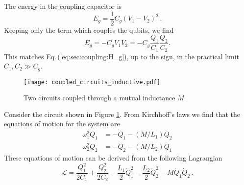 
The energy in the coupling capacitor is
\begin{equation}
E_g = \frac{1}{2} C_g \left( V_1 - V_2 \right)^2 \, . \nonumber
\end{equation}
Keeping only the term which couples the qubits, we find \begin{equation}
E_g = -C_g V_1 V_2 = -C_g \frac{Q_1}{C_1} \frac{Q_2}{C_2} . \end{equation}
This matches Eq.\,(\ref{eq:sec:coupling:H_g}), up to the sign, in the practical limit $C_1,C_2 \gg C_g$.


\begin{figure}
\begin{centering}
\texttt{[image: coupled\_circuits\_inductive.pdf]}
\par\end{centering}
\caption{Two circuits coupled through a mutual inductance $M$.}
\label{Fig:coupledCircuits_inductive}
\end{figure}


Consider the circuit shown in Figure \ref{Fig:coupledCircuits_inductive}.
From Kirchhoff's laws we find that the equations of motion for the system are
\begin{align}
\omega_1^2 Q_1 &= -\ddot{Q}_1 - \left(M/L_1\right) \ddot{Q}_2 \\
\omega_2^2 Q_2 &= -\ddot{Q}_2 - \left(M/L_2\right) \ddot{Q}_1
\end{align}
These equations of motion can be derived from the following Lagrangian
\begin{equation}
\mathcal{L} = \frac{Q_1^2}{2 C_1} + \frac{Q_2^2}{2 C_2}
- \frac{L_1}{2}\dot{Q}_1^2
- \frac{L_2}{2}\dot{Q}_2^2
- M \dot{Q}_1 \dot{Q}_2 \, . \label{eq:sec.coupling.subsec.inductiveCoupling:Lagrangian}
\end{equation}

